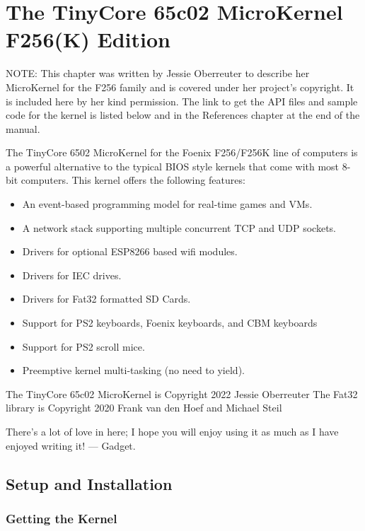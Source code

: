 \chapter{The TinyCore 65c02 MicroKernel F256(K) Edition}
\label{chp:kernel}

\begin{leftbar}
  NOTE: This chapter was written by Jessie Oberreuter to describe her MicroKernel for the F256 family and is covered under her project's copyright. It is included here by her kind permission. The link to get the API files and sample code for the kernel is listed below and in the References chapter at the end of the manual.
\end{leftbar}
  
The TinyCore 6502 MicroKernel for the Foenix F256/F256K line of computers is a powerful alternative to the typical BIOS style kernels that come with most 8-bit computers.  This kernel offers the following features:

\begin{itemize}
    \item An event-based programming model for real-time games and VMs.
    \item A network stack supporting multiple concurrent TCP and UDP sockets.
    \item Drivers for optional ESP8266 based wifi modules.
    \item Drivers for IEC drives.
    \item Drivers for Fat32 formatted SD Cards.
    \item Support for PS2 keyboards, Foenix keyboards, and CBM keyboards
    \item Support for PS2 scroll mice.
    \item Preemptive kernel multi-tasking (no need to yield). 
\end{itemize}

The TinyCore 65c02 MicroKernel is Copyright 2022 Jessie Oberreuter
The Fat32 library is Copyright 2020 Frank van den Hoef and Michael Steil  

There's a lot of love in here; I hope you will enjoy using it as much as I have enjoyed writing it! --- Gadget.

\section*{Setup and Installation}

\subsection*{Getting the Kernel}

